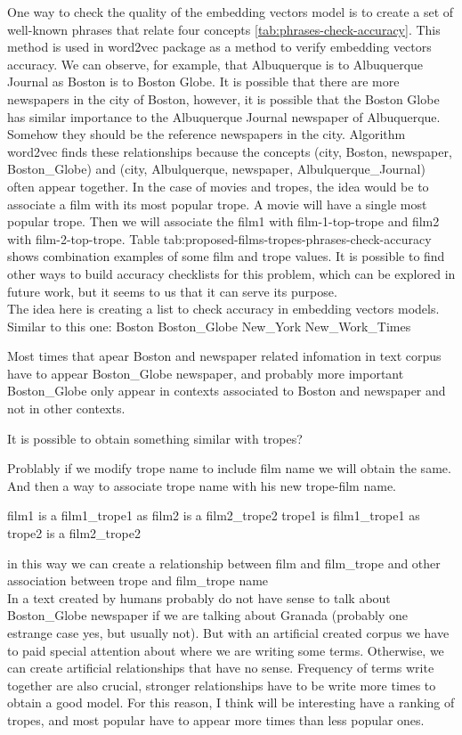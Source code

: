 \documentclass[letterpaper]{article}
\begin{document}
	One way to check the quality of the embedding vectors model is to create a set of 
	well-known phrases that relate four concepts \ref{tab:phrases-check-accuracy}. This method is used in word2vec package \cite{mikolov2013} as a method to verify 
	embedding vectors accuracy. We can observe, for example, that Albuquerque is to Albuquerque Journal
	as Boston is to Boston Globe. It is possible that there are more newspapers in the city of Boston, however, it is possible that the Boston Globe has similar importance to the Albuquerque Journal newspaper of Albuquerque. Somehow they should be the reference newspapers in the city. Algorithm word2vec finds these relationships because the concepts (city, Boston, newspaper, Boston\_Globe) and (city, Albulquerque, newspaper, Albulquerque\_Journal) often appear together. 
	In the case of movies and tropes, the idea would be to associate a film with its most popular trope. A movie will have a single most popular trope. 
	Then we will associate the film1 with film-1-top-trope and film2 with film-2-top-trope. Table tab:proposed-films-tropes-phrases-check-accuracy shows combination examples of some film and trope values. It is possible to find other ways to build accuracy checklists for this problem, which can be explored in future work,
	but it seems to us that it can serve its purpose.\\
	
	The idea here is creating a list to check accuracy in embedding vectors models.
	Similar to this one:
	Boston Boston\_Globe New\_York New\_Work\_Times
	
	Most times that apear Boston and newspaper related infomation in text corpus have to appear Boston\_Globe newspaper, and probably more important Boston\_Globe only appear in contexts associated to Boston and newspaper and not in other contexts.
	
	It is possible to obtain something similar with tropes?
	
	Problably if we modify trope name to include film name we will obtain the same. And then a way to associate trope name with his new trope-film name.
	
	film1 is a film1\_trope1 as film2 is a film2\_trope2
	trope1 is film1\_trope1 as trope2 is a film2\_trope2
	
	in this way we can create a relationship between film and film\_trope and other association between
	trope and film\_trope name \\
	
	In a text created by humans probably do not have sense to talk about Boston\_Globe newspaper if we are talking about Granada (probably one estrange case yes, but usually not). But with an artificial created corpus we have to paid special attention about where we are writing some terms. Otherwise, we can create artificial relationships that have no sense. Frequency of terms write together are also crucial, stronger relationships have to be write more times to obtain a good model. For this reason, I think will be interesting have a ranking of tropes, and most popular have to appear more times than less popular ones. \\
	
\end{document}
